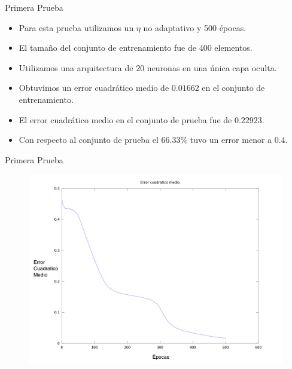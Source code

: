\documentclass{beamer}
\begin{document}
\begin{frame}{Primera Prueba}
\begin{itemize}
\item Para esta prueba utilizamos un $\eta$ no adaptativo y 500 épocas.
\item El tamaño del conjunto de entrenamiento fue de 400 elementos.
\item Utilizamos una arquitectura de 20 neuronas en una única capa oculta.
\item Obtuvimos un error cuadrático medio de $0.01662$ en el conjunto de entrenamiento.
\item El error cuadrático medio en el conjunto de prueba fue de $0.22923$.
\item Con respecto al conjunto de prueba el $66.33$\% tuvo un error menor a 0.4.
\end{itemize}
\end{frame}
\begin{frame}{Primera Prueba}
\begin{figure}[H]
\begin{center}
\includegraphics[scale=0.20]{images/t2-4/ecm.png}
\label{modelado}
\end{center}
\end{figure}
\end{frame}
\end{document}
